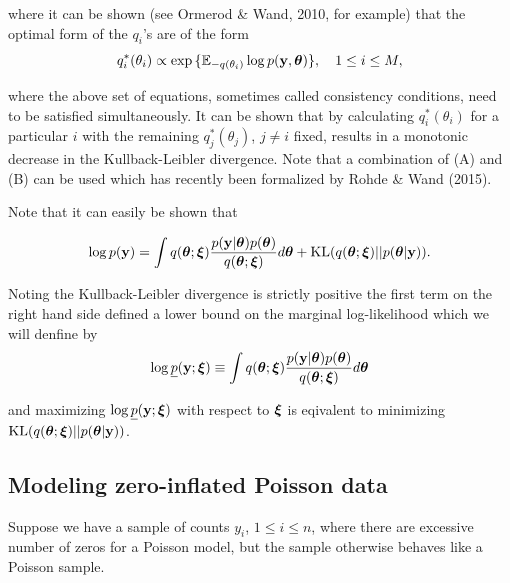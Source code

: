 \documentclass[times, doublespace]{anzsauth}
\begin{document}
\noindent where it can be shown (see Ormerod \& Wand, 2010, for example) that the optimal form of the
$q_i$'s are of the form
\begin{equation}\label{eq:consistency}
	q_i^*(\theta_i) \propto \exp{\{ {\mathbb E}_{-q(\theta_i)} \log p({\bf y}, {\boldsymbol\theta}) \}},  \quad 1\le i\le M,
\end{equation}

\noindent where the above set of equations, sometimes called consistency conditions, need to be 
satisfied simultaneously. It can be shown that by calculating $q_i^*(\theta_i)$ for a particular
$i$ with the remaining $q_j^*(\theta_j)$, $j\ne i$ fixed, results in a monotonic decrease in the 
Kullback-Leibler divergence. Note that a combination of (A) and (B) can be used which has recently
been formalized by Rohde \& Wand (2015). 

\noindent Note that it can easily be shown that

$$
\displaystyle \log p({\bf y}) = \int q({\boldsymbol \theta};{\boldsymbol \xi})\frac{p({\bf y}|{\boldsymbol \theta})p({\boldsymbol \theta})}{q({\boldsymbol \theta};{\boldsymbol \xi})} d{\boldsymbol \theta} + \text{KL}(q({\boldsymbol \theta};{\boldsymbol \xi})||p({\boldsymbol \theta}|{\bf y})).
$$

\noindent Noting the Kullback-Leibler divergence is strictly positive the first term on the right hand side
defined a lower bound on the marginal log-likelihood which we will denfine by
$$
\displaystyle \log \underline{p}({\bf y};{\boldsymbol \xi}) \equiv \int q({\boldsymbol \theta};{\boldsymbol \xi})\frac{p({\bf y}|{\boldsymbol \theta})p({\boldsymbol \theta})}{q({\boldsymbol \theta};{\boldsymbol \xi})} d{\boldsymbol \theta}
$$

\noindent and maximizing $\log \underline{p}({\bf y};{\boldsymbol \xi})$ with respect to ${\boldsymbol \xi}$ is eqivalent to minimizing
$\text{KL}(q({\boldsymbol \theta};{\boldsymbol \xi})||p({\boldsymbol \theta}|{\bf y}))$.


\subsection{Modeling zero-inflated Poisson data}

Suppose we have a sample of counts $y_i$, $1\le i\le n$, where there are excessive number of zeros 
for a Poisson model, but the sample otherwise behaves like a Poisson sample.
\end{document}
